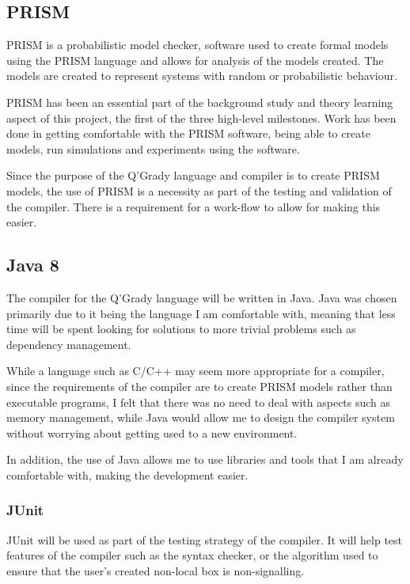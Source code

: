 \documentclass[11pt, a4paper]{article}
\begin{document}
\subsection{PRISM}
\label{sub:prism}
PRISM is a probabilistic model checker, software used to create formal models
using the PRISM language and allows for analysis of the models created. The
models are created to represent systems with random or probabilistic behaviour.

PRISM has been an essential part of the background study and theory learning
aspect of this project, the first of the three high-level milestones. Work has
been done in getting comfortable with the PRISM software, being able to create
models, run simulations and experiments using the software.

Since the purpose of the Q'Grady language and compiler is to create PRISM
models, the use of PRISM is a necessity as part of the testing and validation of
the compiler. There is a requirement for a work-flow to allow for making this
easier.

\subsection{Java 8}
\label{sub:java_eight}
The compiler for the Q'Grady language will be written in Java. Java was chosen
primarily due to it being the language I am comfortable with, meaning that less
time will be spent looking for solutions to more trivial problems such as
dependency management.

While a language such as C/C++ may seem more appropriate for a compiler, since
the requirements of the compiler are to create PRISM models rather than
executable programs, I felt that there was no need to deal with aspects such as
memory management, while Java would allow me to design the compiler system
without worrying about getting used to a new environment.

In addition, the use of Java allows me to use libraries and tools that I am
already comfortable with, making the development easier.

\subsubsection{JUnit}
\label{sub:junit}
JUnit will be used as part of the testing strategy of the compiler. It will help
test features of the compiler such as the syntax checker, or the algorithm used
to ensure that the user's created non-local box is non-signalling.
\end{document}
